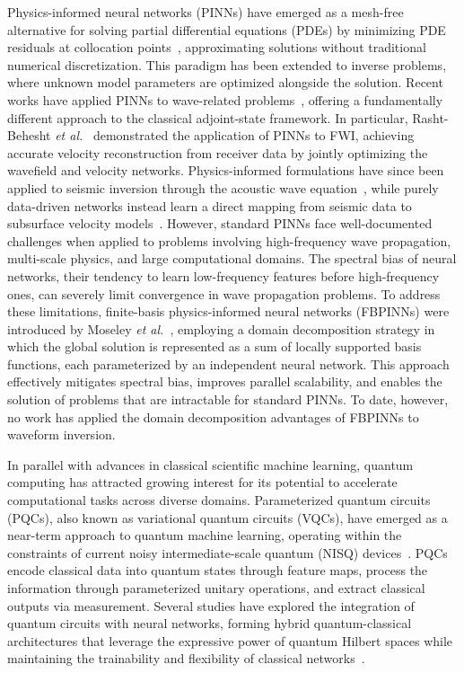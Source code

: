 Physics-informed neural networks (PINNs) have emerged as a mesh-free alternative for solving partial differential equations (PDEs) by minimizing PDE residuals at collocation points~\cite{RAISSI2019686}, approximating solutions without traditional numerical discretization. This paradigm has been extended to inverse problems, where unknown model parameters are optimized alongside the solution. Recent works have applied PINNs to wave-related problems~\cite{10.1093/gji/ggab010, waheed2021pinntomoseismictomographyusing, 10230537}, offering a fundamentally different approach to the classical adjoint-state framework. In particular, Rasht-Behesht \emph{et al.}~\cite{rahst} demonstrated the application of PINNs to FWI, achieving accurate velocity reconstruction from receiver data by jointly optimizing the wavefield and velocity networks. Physics-informed formulations have since been applied to seismic inversion through the acoustic wave equation~\cite{10017252}, while purely data-driven networks instead learn a direct mapping from seismic data to subsurface velocity models~\cite{8931232, 9044635}. However, standard PINNs face well-documented challenges when applied to problems involving high-frequency wave propagation, multi-scale physics, and large computational domains. The spectral bias of neural networks, their tendency to learn low-frequency features before high-frequency ones, can severely limit convergence in wave propagation problems. To address these limitations, finite-basis physics-informed neural networks (FBPINNs) were introduced by Moseley \emph{et al.}~\cite{Moseley2023}, employing a domain decomposition strategy in which the global solution is represented as a sum of locally supported basis functions, each parameterized by an independent neural network. This approach effectively mitigates spectral bias, improves parallel scalability, and enables the solution of problems that are intractable for standard PINNs. To date, however, no work has applied the domain decomposition advantages of FBPINNs to waveform inversion.

In parallel with advances in classical scientific machine learning, quantum computing has attracted growing interest for its potential to accelerate computational tasks across diverse domains. Parameterized quantum circuits (PQCs), also known as variational quantum circuits (VQCs), have emerged as a near-term approach to quantum machine learning, operating within the constraints of current noisy intermediate-scale quantum (NISQ) devices~\cite{Preskill2018quantumcomputingin}. PQCs encode classical data into quantum states through feature maps, process the information through parameterized unitary operations, and extract classical outputs via measurement. Several studies have explored the integration of quantum circuits with neural networks, forming hybrid quantum-classical architectures that leverage the expressive power of quantum Hilbert spaces while maintaining the trainability and flexibility of classical networks~\cite{PhysRevA.101.032308, Benedetti_2019, Ostaszewski2021structure}.

